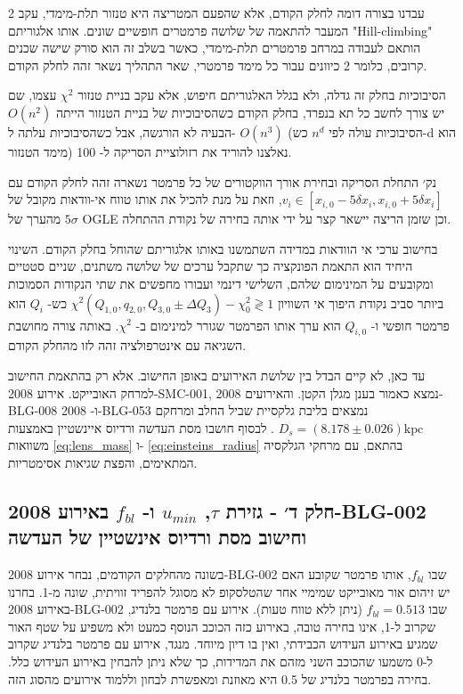 \documentclass{article}
\begin{document}
\begin{multicols}{2}
עבדנו בצורה דומה לחלק הקודם, אלא שהפעם המטריצה היא טנזור תלת-מימדי, עקב המעבר להתאמה של שלושה פרמטרים חופשיים שונים.
אותו אלגוריתם 
\textenglish{"Hill-climbing"}
הותאם לעבודה במרחב פרמטרים תלת-מימדי,
כאשר בשלב זה הוא סורק שישה שכנים קרובים,
כלומר 2 כיוונים עבור כל מימד פרמטרי, שאר התהליך נשאר זהה לחלק הקודם.

הסיבוכיות בחלק זה גדלה, ולא בגלל האלגוריתם חיפוש, אלא עקב בניית טנזור 
$\chi^2$ עצמו,
שם יש צורך לחשב כל תא בנפרד,
בחלק הקודם כשהסיבוכיות של בניית הטנזור הייתה 
$O(n^2)$
הבעיה לא הורגשה,
אבל כשהסיבוכיות עלתה ל-
$O(n^3)$
(הסיבוכיות עולה לפי 
$n^d$
כש-d
הוא מימד הטנזור)
נאלצנו להוריד את רזולוציית הסריקה ל-
100.

נק׳ התחלת הסריקה ובחירת אורך הווקטורים של כל פרמטר נשארה זהה לחלק הקודם עם
\mbox{$v_i \in [x_{i,0}-5\delta x_i ,x_{i,0}+5\delta x_i]$},
וזאת על מנת להכיל את אותו טווח אי-וודאות מקובל של $5\sigma$
מהערך של 
\textenglish{OGLE}
וכן שזמן הריצה 
יישאר קצר על ידי אותה בחירה של נקודת ההתחלה.

בחישוב ערכי אי הוודאות במדידה השתמשנו באותו אלגוריתם שהוחל בחלק הקודם. 
השינוי היחיד הוא התאמת הפונקציה כך שתקבל ערכים של שלושה משתנים, שניים סטטיים ומקובעים על המינימום שלהם, השלישי דינמי ועבורו מחפשים את
שתי הנקודות הסמוכות ביותר סביב נקודת היפוך אי השוויון
\mbox{$ \chi^2(Q_{1,0},q_{2,0},Q_{3,0}\pm\Delta Q_3) - \chi^2_0  \gtrless  1 $}
כש-
$Q_i$
הוא פרמטר חופשי
ו-
$Q_{i,0}$
הוא ערך אותו הפרמטר שגורר למינימום
ב-
$\chi^2$.
באותה צורה מחושבת השגיאה עם אינטרפולציה זהה
לזו מהחלק הקודם.

עד כאן, לא קיים הבדל בין שלושת האירועים באופן החישוב.
אלא רק בהתאמת החישוב למרחק האובייקט.
אירוע
2008-SMC-001,
נמצא כאמור בענן מגלן הקטן.
והאירועים
\mbox{2008-BLG-008}
 ו-
 \mbox{2008-BLG-053}
נמצאים בליבת גלקסיית שביל החלב 
ומרחקם
\mbox{$D_s=(8.178\pm 0.026)\text{kpc}$}
\cite{blg_distance}.
לבסוף חושבו מסת העדשה ורדיוס איינשטיין באמצעות
משוואות
\ref{eq:lens_mass}
ו-
\ref{eq:einsteins_radius}
בהתאם,
עם מרחקי הגלקסיה המתאימים,
 והפצת שגיאות אסימטריות.


 
\subsection{
חלק ד׳
-
גזירת 
$\tau$,
$u_{min}$
ו-
$f_{bl}$
באירוע
\mbox{2008-BLG-002}
וחישוב מסת ורדיוס אינשטיין של העדשה
}

בשונה מהחלקים הקודמים, נבחר אירוע 
\textenglish{2008-BLG-002}
שבו 
$f_{bl}$, 
אותו פרמטר שקובע האם יש זיהום אור מאובייקט שמימיי אחר שהטלסקופ לא מסוגל להפריד זוויתית, שונה מ-1.
בחרנו באירוע 
\mbox{2008-BLG-002}
,שבו 
$f_{bl}=0.513$
\cite{ogle_general_data}
(ניתן ללא טווח טעות).
אירוע עם פרמטר בלנדיג שקרוב ל-1,
אינו בחירה טובה, באירוע כזה הכוכב הנוסף כמעט ולא משפיע על שטף האור שמגיע באירוע העידוש הכבידתי, ואין בו דיון מיוחד.
מנגד, אירוע עם פרמטר בלנדיג שקרוב ל-0
משמעו שהכוכב השני מזהם את המדידות, כך שלא ניתן להבחין באירוע העידוש כלל.
בחירה בפרמטר בלנדיג של 0.5 היא מאוזנת ומאפשרת לבחון וללמוד אירועים מהסוג הזה.


\end{multicols}
\end{document}
